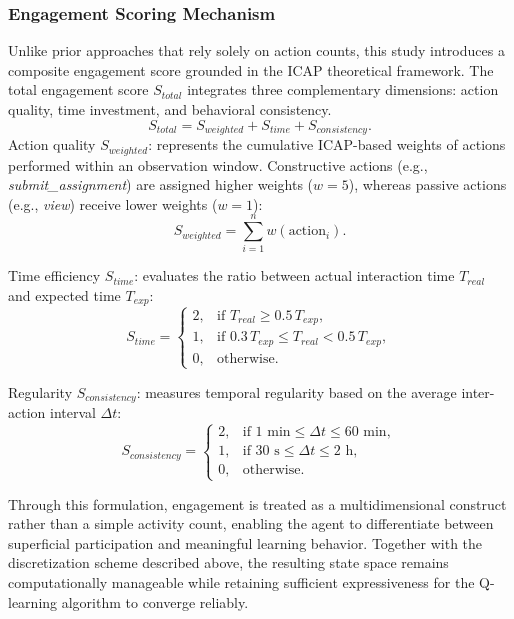 \documentclass[conference]{IEEEtran}
\begin{document}
\subsubsection{Engagement Scoring Mechanism}
Unlike prior approaches that rely solely on action counts, this study introduces a composite engagement score grounded in the ICAP theoretical framework. The total engagement score $S_{total}$ integrates three complementary dimensions: action quality, time investment, and behavioral consistency.
\begin{equation}
S_{total} = S_{weighted} + S_{time} + S_{consistency}.
\end{equation}
Action quality $S_{weighted}$: represents the cumulative ICAP-based weights of actions performed within an observation window. Constructive actions (e.g., \textit{submit\_assignment}) are assigned higher weights ($w=5$), whereas passive actions (e.g., \textit{view}) receive lower weights ($w=1$):
\[
S_{weighted} = \sum_{i=1}^{n} w(\text{action}_i).
\]

Time efficiency $S_{time}$: evaluates the ratio between actual interaction time $T_{real}$ and expected time $T_{exp}$:
\[
S_{time} =
\begin{cases}
2, & \text{if } T_{real} \ge 0.5\,T_{exp}, \\
1, & \text{if } 0.3\,T_{exp} \le T_{real} < 0.5\,T_{exp}, \\
0, & \text{otherwise}.
\end{cases}
\]

Regularity $S_{consistency}$: measures temporal regularity based on the average inter-action interval $\Delta t$:
\[
S_{consistency} =
\begin{cases}
2, & \text{if } 1\text{ min} \le \Delta t \le 60\text{ min}, \\
1, & \text{if } 30\text{ s} \le \Delta t \le 2\text{ h}, \\
0, & \text{otherwise}.
\end{cases}
\]

Through this formulation, engagement is treated as a multidimensional construct rather than a simple activity count, enabling the agent to differentiate between superficial participation and meaningful learning behavior. Together with the discretization scheme described above, the resulting state space remains computationally manageable while retaining sufficient expressiveness for the Q-learning algorithm to converge reliably.
\end{document}
